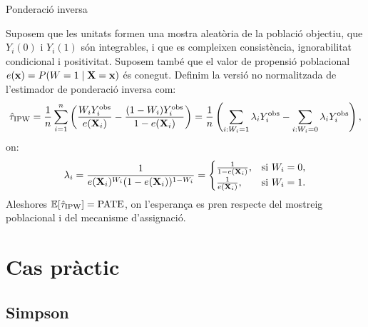 \documentclass{bestbeamer}
\begin{document}
\begin{frame}{Ponderació inversa}
\small
\begin{prop}\label{prop:ipw-pate}
Suposem que les unitats formen una mostra aleatòria de la població objectiu, que $Y_i(0)$ i $Y_i(1)$ són integrables, i que es compleixen consistència, ignorabilitat condicional i positivitat. Suposem també que el valor de propensió poblacional $e(\mathbf{x})=P(W=1\mid \mathbf{X}=\mathbf{x})$ és conegut. Definim la versió no normalitzada de l'estimador de ponderació inversa com:
\begin{equation*}
\hat\tau_{\operatorname{IPW}}
=
\frac{1}{n}\sum_{i=1}^n
\left(
\frac{W_iY_i^{\operatorname{obs}}}{e(\mathbf{X}_i)}
-
\frac{(1-W_i)Y_i^{\operatorname{obs}}}{1-e(\mathbf{X}_i)}
\right)=\frac{1}{n}\left(\sum_{i:W_i=1}\lambda_iY_i^{\operatorname{obs}}-\sum_{i:W_i=0}\lambda_iY_i^{\operatorname{obs}}\right),
\end{equation*}
on:
\begin{equation*}
\lambda_i=\frac{1}{e(\mathbf{X}_i)^{W_i}(1-e(\mathbf{X}_i))^{1-W_i}}=
\begin{cases}
\frac{1}{1-e(\mathbf{X}_i)}, & \text{si } W_i=0, \\
\frac{1}{e(\mathbf{X}_i)}, & \text{si } W_i=1.
\end{cases}
\end{equation*}
Aleshores $\mathbb{E}\!\left[\hat\tau_{\operatorname{IPW}}\right]=\operatorname{PATE}$, on l'esperança es pren respecte del mostreig poblacional i del mecanisme d'assignació.
\end{prop}
\end{frame}

\section{Cas pràctic}
\subsection{Simpson}
\end{document}
